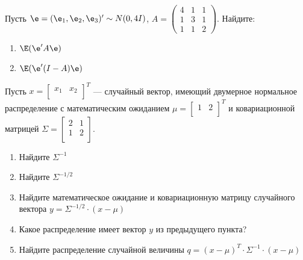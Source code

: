 \documentclass[pdftex,11pt,openany]{book}\usepackage[]{graphicx}\usepackage[]{color}
\begin{document}
\begin{solution}
\end{solution}

\begin{problem}
Пусть $\e = (\e_1, \e_2, \e_3)'\sim N (0,4I)$, $A = \begin{pmatrix} 4 & 1 & 1 \\ 1 & 3 & 1 \\ 1 & 1 & 2 \end{pmatrix}$. Найдите:



\begin{enumerate}
\item $\E(\e'A\e)$
\item $\E(\e'(I - A)\e)$ 
\end{enumerate}
\end{problem}

\begin{solution}
\end{solution}


\begin{problem}
Пусть $x =  \begin{bmatrix}
x_1 & x_2\\
\end{bmatrix} ^T$ --- случайный вектор, имеющий двумерное нормальное распределение с математическим ожиданием $\mu =  \begin{bmatrix}
1 & 2\\
\end{bmatrix} ^T$ и ковариационной матрицей $\Sigma = 
\begin{bmatrix}
2 & 1 \\
1 & 2 \\
\end{bmatrix} $. 

\begin{enumerate}
\item Найдите $\Sigma^{-1}$
\item Найдите $\Sigma^{-1/2}$
\item Найдите математическое ожидание и ковариационную матрицу случайного вектора $y = \Sigma^{-1/2} \cdot (x - \mu)$
\item Какое распределение имеет вектор $y$ из предыдущего пункта?
\item Найдите распределение случайной величины $q = (x- \mu)^T \cdot \Sigma^{-1} \cdot (x - \mu)$
\end{enumerate}
\end{problem}
\end{document}
